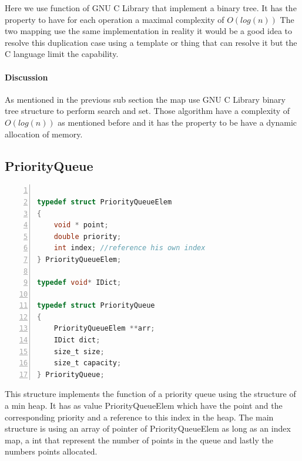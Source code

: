\vspace{1cm}
Here we use function of GNU C Library that implement a binary tree. It has the property to have for each operation a maximal complexity of $O(log(n))$ The two mapping use the same implementation in reality it would be a good idea to resolve this duplication case using a template or thing that can resolve it but the C language limit the capability.

\paragraph{Discussion}
As mentioned in the previous sub section the map use GNU C Library binary tree structure to perform search and set. Those algorithm have a complexity of $O(log(n))$ as mentioned before and it has the property to be have a dynamic allocation of memory.

\subsection{PriorityQueue}

\begin{minipage}{\linewidth}
\begin{lstlisting}[language=C, % Spécifie le langage du code
caption={PriorityQueue}, % Légende du listing
label=lst:prqueue_c, % Étiquette pour référencer le listing
numbers=left,
numberstyle=\tiny\color{gray},
stepnumber=1,
frame=single,
breaklines=true,
postbreak=\mbox{\textcolor{red}{$\hookrightarrow$}\space},
showstringspaces=false
]

typedef struct PriorityQueueElem
{
	void * point;
	double priority;
	int index; //reference his own index
} PriorityQueueElem;

typedef void* IDict;

typedef struct PriorityQueue
{
	PriorityQueueElem **arr;
	IDict dict;
	size_t size;
	size_t capacity;
} PriorityQueue;

\end{lstlisting}
\end{minipage}
\vspace{1cm}

This structure implements the function of a priority queue using the structure of a min heap. It has as value PriorityQueueElem which have the point and the corresponding priority and a reference to this index in the heap. The main structure is using an array of pointer of PriorityQueueElem as long as an index map, a int that represent the number of points in the queue and lastly the numbers points allocated.

